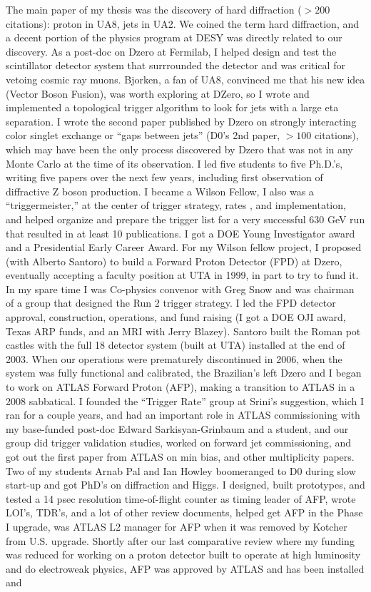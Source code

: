 


 The main paper of my thesis was the discovery of hard diffraction ($>200$ citations): proton in UA8, jets in UA2.  We coined the term hard diffraction, and a decent portion of the physics program at DESY was directly related to our discovery.   As a post-doc on Dzero at Fermilab, I helped design and test the scintillator detector system that surrrounded the detector and was critical for vetoing cosmic ray muons. Bjorken, a fan of UA8, convinced me that his new idea  (Vector Boson Fusion),  was worth exploring at DZero, so I wrote and implemented a topological trigger algorithm to look for jets with a large eta separation.   I wrote the second paper published by Dzero on strongly interacting color singlet exchange or ``gaps between jets''  (D0's 2nd paper, $>100$ citations), which may have been the only process discovered by Dzero that was not in any Monte Carlo at the time of its observation. I led five students to five Ph.D.'s, writing five papers  over the next few years, including first observation of diffractive Z boson production.  I became a Wilson Fellow, I also was a ``triggermeister,''  at the center of trigger strategy, rates , and implementation,  and helped organize and prepare the trigger list for  a very successful 630 GeV run that resulted in at least 10 publications.  I got a  DOE Young Investigator award and a Presidential Early Career Award. For my Wilson fellow project,  I proposed (with Alberto Santoro) to build a Forward Proton Detector (FPD) at Dzero,  eventually accepting a faculty position at  UTA in 1999, in part to try to fund it.  In my spare time I was Co-physics convenor with Greg Snow and was chairman of a group that designed the  Run 2 trigger strategy.  I led  the FPD detector approval, construction, operations, and fund raising (I got a DOE OJI award,  Texas ARP funds,  and an MRI with Jerry Blazey). Santoro built the Roman pot castles  with the full 18 detector system (built at UTA) installed at the end of 2003.  When our operations were prematurely discontinued in 2006, when the system was fully functional and calibrated, the Brazilian's left Dzero  and I began to work on ATLAS Forward Proton (AFP), making a transition to ATLAS in a 2008 sabbatical. I founded the  ``Trigger Rate'' group at Srini's suggestion,  which I ran for a couple years, and had an important role in ATLAS commissioning with my base-funded post-doc Edward Sarkisyan-Grinbaum and a student, and our group did trigger validation studies, worked on forward jet commissioning,  and got out the first paper from ATLAS on min bias,  and other multiplicity papers.  Two of my students Arnab Pal and Ian Howley  boomeranged to D0  during slow start-up and got PhD's on diffraction and Higgs.  I designed, built prototypes, and tested a 14 psec resolution time-of-flight counter as timing leader of AFP, wrote LOI's, TDR's, and a lot of other review documents, helped get AFP in the Phase I upgrade, was ATLAS L2 manager for AFP when it was removed by Kotcher from U.S. upgrade. Shortly after our last comparative review where my funding was reduced for working on a proton detector built to operate at high luminosity and do electroweak physics, AFP was approved by ATLAS and has been installed and 